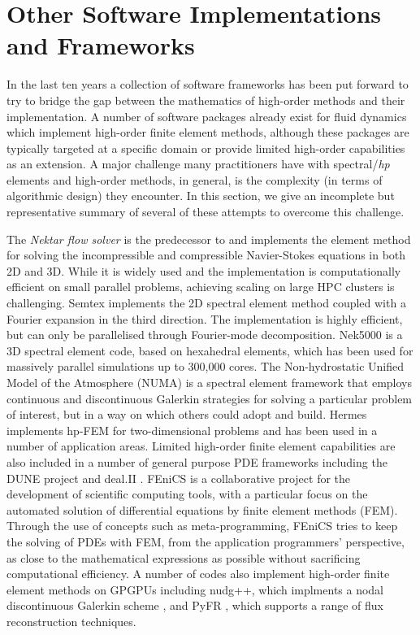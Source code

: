 \section{Other Software Implementations and Frameworks}

In the last ten years a collection of software frameworks has been put forward to try to bridge the gap between the 
mathematics of high-order methods and their implementation. 
A number of software packages already exist for fluid dynamics which implement
high-order finite element methods, although these packages are typically targeted at a specific
domain or provide limited high-order capabilities as an extension.
A major challenge many practitioners have with
spectral/{\em hp\/} elements and high-order methods, in general, is the complexity (in terms of algorithmic design) they
encounter. In this section, we give an incomplete but
representative summary of several of these attempts to overcome this challenge.

The \emph{Nektar flow solver} is the predecessor to \nek{} and
implements the \shp{} element method for solving the incompressible
and compressible Navier-Stokes equations in both 2D and 3D. While it is widely
used and the implementation is computationally efficient on small parallel problems,
achieving scaling on large HPC clusters is challenging. Semtex \cite{BlSh04}
implements the 2D spectral element method coupled with a Fourier expansion in
the third direction. The implementation is highly efficient, but can only be
parallelised through Fourier-mode decomposition.
Nek5000 \cite{Nek5000} is a 3D spectral element code, based on hexahedral
elements, which has been used for massively parallel simulations up to 300,000
cores. The Non-hydrostatic Unified Model of the Atmosphere (NUMA) \cite{GiraldoKC13} is a spectral element framework that employs continuous 
and discontinuous Galerkin
strategies for solving a particular problem of interest, but in a way on which others could adopt and build.  
Hermes \cite{VeSoZi07} implements hp-FEM for two-dimensional problems and
has been used in a number of application areas. Limited high-order finite
element capabilities are also included in a number of general purpose PDE
frameworks including the DUNE project \cite{DeKlNoOh11} and deal.II
\cite{BaHaKa07}.
FEniCS \cite{FEniCS} is a collaborative project for the development of scientific computing tools, with a particular focus 
on the automated solution of differential equations by finite element methods (FEM).  Through the use of concepts such as meta-programming,
FEniCS tries to keep the solving of PDEs with FEM, from the application programmers' perspective, as close to the mathematical expressions
as possible without sacrificing computational efficiency.
A number of codes also implement high-order finite element methods on
GPGPUs including nudg++, which
implments a nodal discontinuous Galerkin scheme \cite{HeWa07}, and PyFR
\cite{WiFaVi14}, which supports a range of flux reconstruction techniques.

